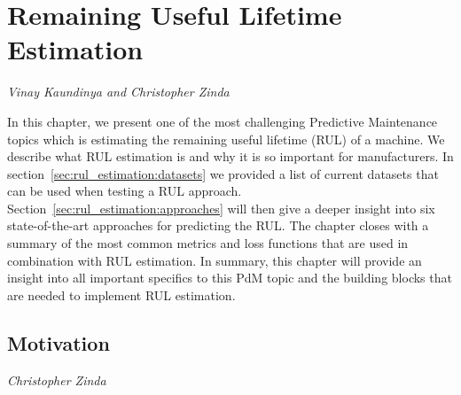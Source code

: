 %
\chapter{Remaining Useful Lifetime Estimation}
\label{sec:rul_estimation}
\vspace*{-15mm}\hfill{\normalsize\emph{Vinay Kaundinya and Christopher Zinda}}


In this chapter, we present one of the most challenging Predictive Maintenance topics which is estimating the remaining useful lifetime (RUL) of a machine. We describe what RUL estimation is and why it is so important for manufacturers. In section~\ref{sec:rul_estimation:datasets} we provided a list of current datasets that can be used when testing a RUL approach. Section~\ref{sec:rul_estimation:approaches} will then give a deeper insight into six state-of-the-art approaches for predicting the RUL. The chapter closes with a summary of the most common metrics and loss functions that are used in combination with RUL estimation. In summary, this chapter will provide an insight into all important specifics to this PdM topic and the building blocks that are needed to implement RUL estimation.

\section{Motivation}
\vspace*{-12.5mm}\hfill{\normalsize\emph{Christopher Zinda}}
\label{sec:rul_estimation:motivation}

